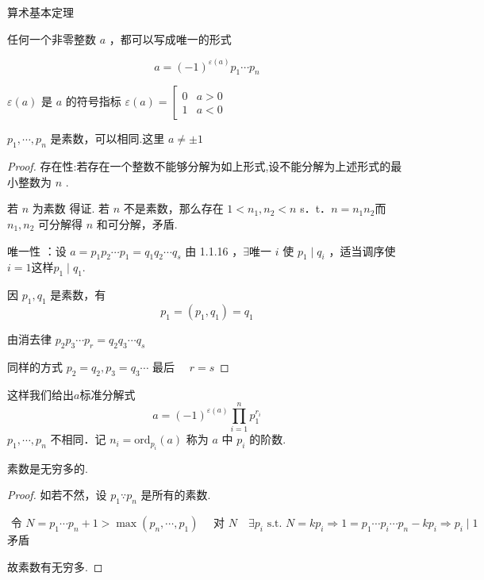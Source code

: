 \begin{theorem}算术基本定理
	
	任何一个非零整数 $a$ ，都可以写成唯一的形式
	
	$$
	a=(-1)^{\varepsilon(a)} p_1 \cdots p_n
	$$
	
	$\varepsilon(a)$ 是 $a$ 的符号指标 $\varepsilon (a)=\left[\begin{array}{ll}0 & a>0 \\ 1 & a<0\end{array}\right.$ 
	
	$p_1, \cdots, p_n$ 是素数，可以相同.这里 $a\ne \pm1$
	
\end{theorem}
\begin{proof}
	存在性:若存在一个整数不能够分解为如上形式,设不能分解为上述形式的最小整数为 $n$ .
	
	若 $n$ 为素数 得证. 若 $n$ 不是素数，那么存在 $1<n_1, n_2<n $ s．t．$n=n_1n_2$而 $n_1, n_2$ 可分解得 $n$ 和可分解，矛盾.
	
	唯一性 ：设 $a=p_1 p_2 \cdots p_1=q_1 q_2 \cdots q_s$
	由 1.1.16 ，$\exists$唯一 $i$ 使 $p_1 \mid q_i$ ，适当调序使 $i=1 $这样$ p_1 \mid q_1$.
	
	因 $p_1, q_1$ 是素数，有
	$$p_1=\left(p_1, q_1\right)=q_1$$
	
	由消去律 $p_2 p_3 \cdots p_r=q_2 q_3 \cdots q_s$
	
	同样的方式 $p_2=q_2, p_3=q_3 \cdots$ 最后 $\quad r=s$
\end{proof}
这样我们给出$a$标准分解式
$$
a=(-1)^{\varepsilon(a)} \prod_{i=1}^{n}p_1^{r_i}
$$
\label{p1:concept:c1-l498}$p_1, \cdots, p_n$ 不相同．记 $n_i=\text{ord}_{p_i}(a)$ 称为 $a$ 中 $p_i$ 的阶数.
\begin{theorem}
	素数是无穷多的.
	
	
	
	
\end{theorem}
\begin{proof}
	如若不然，设 $p_1 \because p_n$ 是所有的素数.
	
	$\text { 令 } N=p_1 \cdots p_n+1>\max(p_n, \cdots, p_1 )\quad \text { 对 } N \quad \exists p_i \text { s.t. } N=k p_i\Rightarrow1=p_1\cdots p_i\cdots p_n-kp_i\Rightarrow p_i\mid1
	$
	矛盾
	
	故素数有无穷多.
	
\end{proof}
